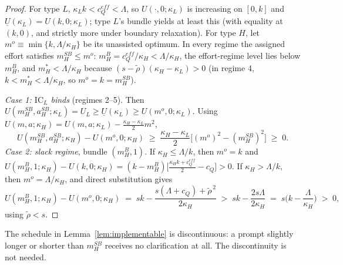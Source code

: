 \documentclass[11pt]{article}
\begin{document}
\begin{proof}
For type $L$, $\kappa_L k < c_Q^{eff} < \Lambda$, so $U(\cdot,0;\kappa_L)$ is increasing on $[0,k]$ and $\underline{U}(\kappa_L) = U(k,0;\kappa_L)$; type $L$'s bundle yields at least this (with equality at $(k,0)$, and strictly more under boundary relaxation). For type $H$, let $m^o \equiv \min\{k, \Lambda/\kappa_H\}$ be its unassisted optimum. In every regime the assigned effort satisfies $m_H^{SB} \le m^o$: $m_H^B = c_Q^{eff}/\kappa_H < \Lambda/\kappa_H$, the effort-regime level lies below $m_H^B$, and $m_H^* < \Lambda/\kappa_H$ because $(s - \tilde\rho)(\kappa_H - \kappa_L) > 0$ (in regime 4, $k < m_H^* < \Lambda/\kappa_H$, so $m^o = k = m_H^{SB}$).

\emph{Case 1: $\text{IC}_L$ binds} (regimes 2--5). Then $U(m_H^{SB}, a_H^{SB};\kappa_L) = U_L \ge \underline{U}(\kappa_L) \ge U(m^o,0;\kappa_L)$. Using $U(m,a;\kappa_H) = U(m,a;\kappa_L) - \frac{\kappa_H - \kappa_L}{2}m^2$,
\[
U(m_H^{SB}, a_H^{SB};\kappa_H) - U(m^o, 0;\kappa_H) \;\ge\; \frac{\kappa_H - \kappa_L}{2}\Big[(m^o)^2 - (m_H^{SB})^2\Big] \;\ge\; 0.
\]
\emph{Case 2: slack regime}, bundle $(m_H^B, 1)$. If $\kappa_H \le \Lambda/k$, then $m^o = k$ and $U(m_H^B,1;\kappa_H) - U(k,0;\kappa_H) = (k - m_H^B)\big[\frac{\kappa_H k + c_Q^{eff}}{2} - c_Q\big] > 0$. If $\kappa_H > \Lambda/k$, then $m^o = \Lambda/\kappa_H$, and direct substitution gives
\[
U(m_H^B,1;\kappa_H) - U(m^o,0;\kappa_H) \;=\; s k - \frac{s(\Lambda + c_Q) + \tilde\rho^{\,2}}{2\kappa_H} \;>\; s k - \frac{2 s\Lambda}{2\kappa_H} \;=\; s\Big(k - \frac{\Lambda}{\kappa_H}\Big) \;>\; 0,
\]
using $\tilde\rho < s$.
\end{proof}

The schedule in Lemma~\ref{lem:implementable} is discontinuous: a prompt slightly longer or shorter than $m_H^{SB}$ receives no clarification at all. The discontinuity is not needed.
\end{document}
